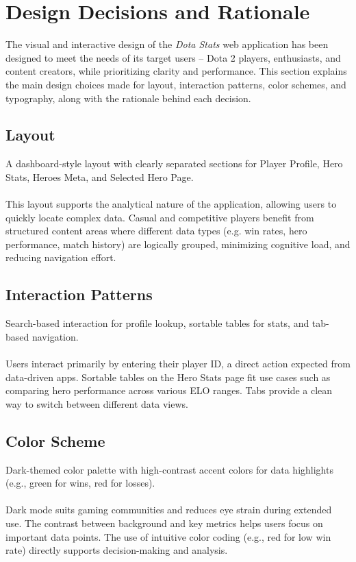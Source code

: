 \section{Design Decisions and Rationale}

The visual and interactive design of the \textit{Dota Stats} web application has been designed to meet the needs of its target users -- Dota 2 players, enthusiasts, and content creators, while prioritizing clarity and performance. This section explains the main design choices made for layout, interaction patterns, color schemes, and typography, along with the rationale behind each decision.

\subsection{Layout}

A dashboard-style layout with clearly separated sections for Player Profile, Hero Stats, Heroes Meta, and Selected Hero Page.
\\
\\
This layout supports the analytical nature of the application, allowing users to quickly locate complex data. Casual and competitive players benefit from structured content areas where different data types (e.g. win rates, hero performance, match history) are logically grouped, minimizing cognitive load, and reducing navigation effort.

\subsection{Interaction Patterns}

Search-based interaction for profile lookup, sortable tables for stats, and tab-based navigation.
\\
\\
Users interact primarily by entering their player ID, a direct action expected from data-driven apps. Sortable tables on the Hero Stats page fit use cases such as comparing hero performance across various ELO ranges. Tabs provide a clean way to switch between different data views.

\subsection{Color Scheme}

Dark-themed color palette with high-contrast accent colors for data highlights (e.g., green for wins, red for losses).
\\
\\
Dark mode suits gaming communities and reduces eye strain during extended use. The contrast between background and key metrics helps users focus on important data points. The use of intuitive color coding (e.g., red for low win rate) directly supports decision-making and analysis.

